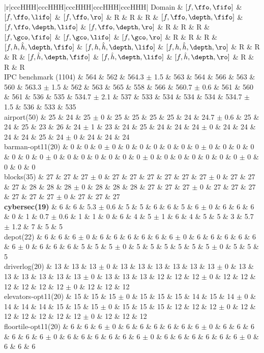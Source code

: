 \begin{center}
\begin{tabular}{|r|cccHHH|cccHHH|cccHHH|cccHHH|cccHHH|}
Domain & $[f,\ffo,\fifo]$ & $[f,\ffo,\lifo]$ & $[f,\ffo,\ro]$ & R & R & R & $[f,\ffo,\depth,\fifo]$ & $[f,\ffo,\depth,\lifo]$ & $[f,\ffo,\depth,\ro]$ & R & R & R & $[f,\gco,\fifo]$ & $[f,\gco,\lifo]$ & $[f,\gco,\ro]$ & R & R & R & $[f,h,\hat{h},\depth,\fifo]$ & $[f,h,\hat{h},\depth,\lifo]$ & $[f,h,\hat{h},\depth,\ro]$ & R & R & R & $[f,\hat{h},\depth,\fifo]$ & $[f,\hat{h},\depth,\lifo]$ & $[f,\hat{h},\depth,\ro]$ & R & R & R\\
\hline
IPC benchmark (1104) & 564 & 562 & 564.3 $\pm$ 1.5 & 563 & 564 & 566 & 563 & 560 & 563.3 $\pm$ 1.5 & 562 & 563 & 565 & 558 & 566 & 560.7 $\pm$ 0.6 & 561 & 560 & 561 & 536 & 535 & 534.7 $\pm$ 2.1 & 537 & 533 & 534 & 534 & 534 & 534.7 $\pm$ 1.5 & 536 & 533 & 535\\
\hline
airport(50) & 25 & 24 & 25 $\pm$ 0 & 25 & 25 & 25 & 25 & 24 & 24.7 $\pm$ 0.6 & 25 & 24 & 25 & 23 & 26 & 24 $\pm$ 1 & 23 & 24 & 25 & 24 & 24 & 24 $\pm$ 0 & 24 & 24 & 24 & 24 & 25 & 24 $\pm$ 0 & 24 & 24 & 24\\
barman-opt11(20) & 0 & 0 & 0 $\pm$ 0 & 0 & 0 & 0 & 0 & 0 & 0 $\pm$ 0 & 0 & 0 & 0 & 0 & 0 & 0 $\pm$ 0 & 0 & 0 & 0 & 0 & 0 & 0 $\pm$ 0 & 0 & 0 & 0 & 0 & 0 & 0 $\pm$ 0 & 0 & 0 & 0\\
blocks(35) & 27 & 27 & 27 $\pm$ 0 & 27 & 27 & 27 & 27 & 27 & 27 $\pm$ 0 & 27 & 27 & 27 & 28 & 28 & 28 $\pm$ 0 & 28 & 28 & 28 & 27 & 27 & 27 $\pm$ 0 & 27 & 27 & 27 & 27 & 27 & 27 $\pm$ 0 & 27 & 27 & 27\\
\textbf{cybersec(19)} & 6 & 6 & 5.3 $\pm$ 0.6 & 5 & 5 & 6 & 6 & 5 & 6 $\pm$ 0 & 6 & 6 & 6 & 0 & 1 & 0.7 $\pm$ 0.6 & 1 & 1 & 0 & 6 & 4 & 5 $\pm$ 1 & 6 & 4 & 5 & 5 & 3 & 5.7 $\pm$ 1.2 & 7 & 5 & 5\\
depot(22) & 6 & 6 & 6 $\pm$ 0 & 6 & 6 & 6 & 6 & 6 & 6 $\pm$ 0 & 6 & 6 & 6 & 6 & 6 & 6 $\pm$ 0 & 6 & 6 & 6 & 5 & 5 & 5 $\pm$ 0 & 5 & 5 & 5 & 5 & 5 & 5 $\pm$ 0 & 5 & 5 & 5\\
driverlog(20) & 13 & 13 & 13 $\pm$ 0 & 13 & 13 & 13 & 13 & 13 & 13 $\pm$ 0 & 13 & 13 & 13 & 13 & 13 & 13 $\pm$ 0 & 13 & 13 & 13 & 12 & 12 & 12 $\pm$ 0 & 12 & 12 & 12 & 12 & 12 & 12 $\pm$ 0 & 12 & 12 & 12\\
elevators-opt11(20) & 15 & 15 & 15 $\pm$ 0 & 15 & 15 & 15 & 14 & 15 & 14 $\pm$ 0 & 14 & 14 & 14 & 15 & 15 & 15 $\pm$ 0 & 15 & 15 & 15 & 12 & 12 & 12 $\pm$ 0 & 12 & 12 & 12 & 12 & 12 & 12 $\pm$ 0 & 12 & 12 & 12\\
floortile-opt11(20) & 6 & 6 & 6 $\pm$ 0 & 6 & 6 & 6 & 6 & 6 & 6 $\pm$ 0 & 6 & 6 & 6 & 6 & 6 & 6 $\pm$ 0 & 6 & 6 & 6 & 6 & 6 & 6 $\pm$ 0 & 6 & 6 & 6 & 6 & 6 & 6 $\pm$ 0 & 6 & 6 & 6\\

\end{tabular}
\end{center}
